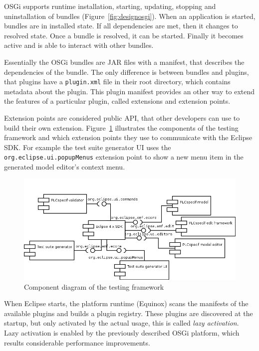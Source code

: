 OSGi supports runtime installation, starting, updating, stopping and uninstallation of bundles (Figure~\ref{fig:designosgi}). When an application is started, bundles are in installed state. If all dependencies are met, then it changes to resolved state. Once a bundle is resolved, it can be started. Finally it becomes active and is able to interact with other bundles.

Essentially the OSGi bundles are JAR files with a manifest, that describes the dependencies of the bundle. The only difference is between bundles and plugins, that plugins have a \texttt{plugin.xml} file in their root directory, which contains metadata about the plugin. This plugin manifest provides an other way to extend the features of a particular plugin, called extensions and extension points.

Extension points are considered public API, that other developers can use to build their own extension. Figure~\ref{fig:designcomponents} illustrates the components of the testing framework and which extension points they use to communicate with the Eclipse SDK. For example the test suite generator UI uses the \texttt{org.eclipse.ui.popupMenus} extension point to show a new menu item in the generated model editor's context menu.

\begin{figure}[htp]
\centering
\includegraphics[scale=0.5]{figures/design_components.png}
\caption{Component diagram of the testing framework}
\label{fig:designcomponents}
\end{figure}

When Eclipse starts, the platform runtime (Equinox) scans the manifests of the available plugins and builds a plugin registry. These plugins are discovered at the startup, but only activated by the actual usage, this is called \textit{lazy activation}. Lazy activation is enabled by the previously described OSGi platform, which results considerable performance improvements.

